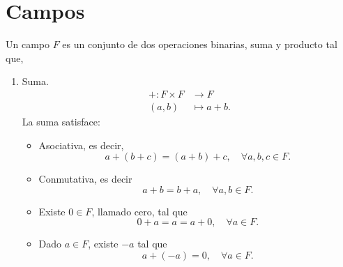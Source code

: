 \documentclass[12pt,a4paper]{book}
\begin{document}
    \section{Campos}
    Un campo $F$ es un conjunto de dos operaciones binarias, suma y producto tal que,
    \begin{enumerate}
        \item Suma.
        \begin{align*}
            +: F \times F &\to F \\
            (a,b) &\mapsto a+b.
        \end{align*}
        La suma satisface:
        \begin{itemize}
            \item Asociativa, es decir, 
            \begin{equation*}
                a + (b + c) = (a + b) + c, \quad \forall a,b,c \in F.
            \end{equation*}
            \item Conmutativa, es decir
            \begin{equation*}
                a + b = b + a, \quad \forall a,b \in F.
            \end{equation*}
            \item Existe $0 \in F$, llamado cero, tal que
            \begin{equation*}
                0 + a = a = a + 0, \quad \forall a \in F.
            \end{equation*}
            \item Dado $a \in F$, existe $-a$ tal que
            \begin{equation*}
                a + (-a) = 0, \quad \forall a \in F.
            \end{equation*}
        \end{itemize}
        

\end{enumerate}
\end{document}
